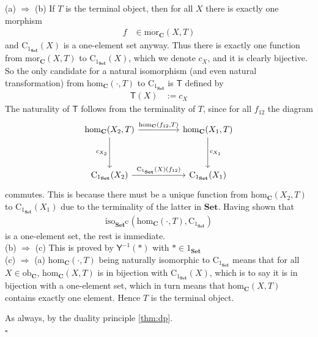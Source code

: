 \begin{prf}
\item[(1T)]
{\glqq}(a) $\Rightarrow$ (b){\grqq}
\qquad
If $T$ is the terminal object, then for all $X$ there is exactly one morphism
\begin{align*}
  f
  &\in
  \mathrm{mor}_{\mathbf{C}}(X,T)
\end{align*}
and $\mathrm{C}_{1_{\mathbf{Set}}}(X)$ is a one-element set anyway.
Thus there is exactly one function from $\mathrm{mor}_{\mathbf{C}}(X,T)$ to $\mathrm{C}_{1_{\mathbf{Set}}}(X)$, which we denote $c_{X}$, and it is clearly bijective.
So the only candidate for a natural isomorphism (and even natural transformation) from $\mathrm{hom}_{\mathbf{C}}(\cdot,T)$ to $\mathrm{C}_{1_{\mathbf{Set}}}$ is $\mathsf{T}$ defined by
\begin{align*}
  \mathsf{T}(X)
  &:=
  c_{X}
\end{align*}
The naturality of $\mathsf{T}$ follows from the terminality of $T$, since for all $f_{12}$ the diagram
\[
\begin{tikzcd}[sep=huge]
  \mathrm{hom}_{\mathbf{C}}(X_{2},T)
  \arrow[swap]{d}{c_{X_{2}}}
  \arrow{r}{\mathrm{hom}_{\mathbf{C}}(f_{12},T)}
  &
  \mathrm{hom}_{\mathbf{C}}(X_{1},T)
  \arrow{d}{c_{X_{1}}}
  \\
  \mathrm{C}_{1_{\mathbf{Set}}}(X_{2})
  \arrow{r}{\mathrm{C}_{1_{\mathbf{Set}}}(X)(f_{12})}
  &
  \mathrm{C}_{1_{\mathbf{Set}}}(X_{1})
\end{tikzcd}
\]
commutes.
This is because there must be a unique function from $\mathrm{hom}_{\mathbf{C}}(X_{2},T)$ to $\mathrm{C}_{1_{\mathbf{Set}}}(X_{1})$ due to the terminality of the latter in $\mathbf{Set}$.
Having shown that
\begin{align*}
  \mathrm{iso}_{\mathbf{Set}^{\mathbf{C}}}
  \left(
    \mathrm{hom}_{\mathbf{C}}(\cdot,T),
    \mathrm{C}_{1_{\mathbf{Set}}}
  \right)
\end{align*}
is a one-element set, the rest is immediate.
\\
{\glqq}(b) $\Rightarrow$ (c){\grqq}
\qquad
This is proved by $\mathsf{Y}^{-1}(\ast)$ with $\ast \in 1_{\mathbf{Set}}$
\\
{\glqq}(c) $\Rightarrow$ (a){\grqq}
\qquad
$\mathrm{hom}_{\mathbf{C}}(\cdot,T)$ being naturally isomorphic to $\mathrm{C}_{1_{\mathbf{Set}}}$ means that for all $X \in \mathrm{ob}_{\mathbf{C}}$, $\mathrm{hom}_{\mathbf{C}}(X,T)$ is in bijection with $\mathrm{C}_{1_{\mathbf{Set}}}(X)$, which is to say it is in bijection with a one-element set, which in turn means that $\mathrm{hom}_{\mathbf{C}}(X,T)$ contains exactly one element.
Hence $T$ is the terminal object.
\item[(1I)]
As always, by the duality principle \ref{thm:dp}.
\\
\phantom{proven}
\hfill
$\square$
\end{prf}
